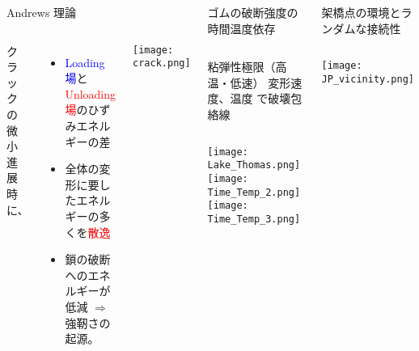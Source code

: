 \begin{columns}[totalwidth=.85\linewidth]
		\begin{itembox}[l]{Andrews 理論\cite{andrews}}
			\begin{columns}[totalwidth=\textwidth]
					クラックの微小進展時に、
					\begin{itemize}
						\item
						\textcolor{blue}{Loading 場}と\textcolor{red}{Unloading 場}のひずみエネルギーの差
						\item
						全体の変形に要したエネルギーの多くを\textcolor{red}{散逸}
						\item
						鎖の破断へのエネルギーが低減 $\Rightarrow$ \alert{強靭さの起源。}
					\end{itemize}	
					\texttt{[image: crack.png]}     
			\end{columns}
		\end{itembox}

		\begin{itembox}[l]{ゴムの破断強度の時間温度依存}
			\begin{columns}[totalwidth=\textwidth]
					\alert{粘弾性極限}\cite{lake}（高温・低速）
					変形速度、温度\cite{smith} で\alert{破壊包絡線}
			\end{columns}
			\begin{columns}[totalwidth=\textwidth]
					\centering
					\texttt{[image: Lake\_Thomas.png]}
					\centering
					\texttt{[image: Time\_Temp\_2.png]}
					\centering
					\texttt{[image: Time\_Temp\_3.png]}
			\end{columns}
		\end{itembox}

		\begin{itembox}[l]{架橋点の環境とランダムな接続性\cite{flory}}
			\begin{columns}[totalwidth=\textwidth]
				\centering
					\texttt{[image: JP\_vicinity.png]}


\end{columns}
\end{itembox}
\end{columns}
